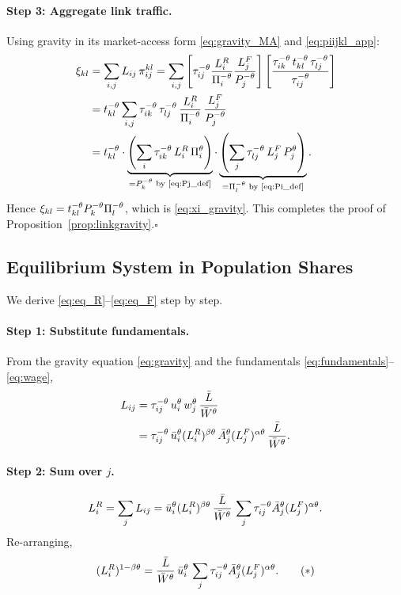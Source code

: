 \paragraph{Step 3: Aggregate link traffic.}
Using gravity in its market-access form \eqref{eq:gravity_MA} and
\eqref{eq:piijkl_app}:
\begin{align*}
  \xi_{kl}
  &=\sum_{i,j}L_{ij}\,\pi^{kl}_{ij}
   =\sum_{i,j}\left[\tau_{ij}^{-\theta}\frac{L_i^R}{\Pi_i^{-\theta}}
                       \frac{L_j^F}{P_j^{-\theta}}\right]
             \left[\frac{\tau_{ik}^{-\theta}\,t_{kl}^{-\theta}\,\tau_{lj}^{-\theta}}
                        {\tau_{ij}^{-\theta}}\right]\\
  &=t_{kl}^{-\theta}
    \sum_{i,j}\tau_{ik}^{-\theta}\,\tau_{lj}^{-\theta}\,
              \frac{L_i^R}{\Pi_i^{-\theta}}\,
              \frac{L_j^F}{P_j^{-\theta}}\\
  &=t_{kl}^{-\theta}\cdot
    \underbrace{\left(\sum_i\tau_{ik}^{-\theta}\,L_i^R\,\Pi_i^{\theta}\right)}_{=P_k^{-\theta}
     \text{ by \eqref{eq:Pj_def}}}\cdot
    \underbrace{\left(\sum_j\tau_{lj}^{-\theta}\,L_j^F\,P_j^{\theta}\right)}_{=\Pi_l^{-\theta}
     \text{ by \eqref{eq:Pi_def}}}.
\end{align*}
Hence $\xi_{kl}=t_{kl}^{-\theta}P_k^{-\theta}\Pi_l^{-\theta}$, which is
\eqref{eq:xi_gravity}.  This completes the proof of
Proposition~\ref{prop:linkgravity}.\hfill$\square$

\subsection{Equilibrium System in Population Shares}\label{app:eqshares}

We derive \eqref{eq:eq_R}--\eqref{eq:eq_F} step by step.

\paragraph{Step 1: Substitute fundamentals.}
From the gravity equation \eqref{eq:gravity} and the fundamentals
\eqref{eq:fundamentals}--\eqref{eq:wage},
\begin{align*}
  L_{ij}
  &=\tau_{ij}^{-\theta}\,u_i^{\theta}\,w_j^{\theta}\,\frac{\bar L}{\bar W^{\theta}}\\
  &=\tau_{ij}^{-\theta}\,\bar u_i^{\theta}(L_i^R)^{\beta\theta}\,
       \bar A_j^{\theta}(L_j^F)^{\alpha\theta}\,\frac{\bar L}{\bar W^{\theta}}.
\end{align*}

\paragraph{Step 2: Sum over $j$.}
\[
  L_i^R=\sum_j L_{ij}
  =\bar u_i^{\theta}(L_i^R)^{\beta\theta}\,\frac{\bar L}{\bar W^{\theta}}\,
     \sum_j\tau_{ij}^{-\theta}\bar A_j^{\theta}(L_j^F)^{\alpha\theta}.
\]
Re-arranging,
\[
  (L_i^R)^{1-\beta\theta}
  =\frac{\bar L}{\bar W^{\theta}}\,\bar u_i^{\theta}\,
     \sum_j\tau_{ij}^{-\theta}\bar A_j^{\theta}(L_j^F)^{\alpha\theta}.
  \tag{$*$}
\]

